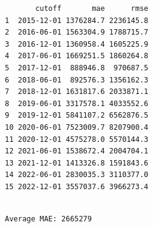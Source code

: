 \documentclass[
]{article}
\newenvironment{Shaded}{\begin{snugshade}}{\end{snugshade}}
\newcommand{\AttributeTok}[1]{\textcolor[rgb]{0.13,0.29,0.53}{#1}}
\newcommand{\CommentTok}[1]{\textcolor[rgb]{0.56,0.35,0.01}{\textit{#1}}}
\newcommand{\FunctionTok}[1]{\textcolor[rgb]{0.13,0.29,0.53}{\textbf{#1}}}
\newcommand{\NormalTok}[1]{#1}
\newcommand{\OtherTok}[1]{\textcolor[rgb]{0.56,0.35,0.01}{#1}}
\newcommand{\SpecialCharTok}[1]{\textcolor[rgb]{0.81,0.36,0.00}{\textbf{#1}}}
\newcommand{\StringTok}[1]{\textcolor[rgb]{0.31,0.60,0.02}{#1}}
\begin{document}
\begin{Shaded}
\end{Shaded}

\begin{verbatim}
       cutoff       mae      rmse
1  2015-12-01 1376284.7 2236145.8
2  2016-06-01 1563304.9 1788715.7
3  2016-12-01 1360958.4 1605225.9
4  2017-06-01 1669251.5 1860264.8
5  2017-12-01  888946.8  970687.5
6  2018-06-01  892576.3 1356162.3
7  2018-12-01 1631817.6 2033871.1
8  2019-06-01 3317578.1 4033552.6
9  2019-12-01 5841107.2 6562876.5
10 2020-06-01 7523009.7 8207900.4
11 2020-12-01 4575278.0 5570144.3
12 2021-06-01 1538672.4 2004704.1
13 2021-12-01 1413326.8 1591843.6
14 2022-06-01 2830035.3 3110377.0
15 2022-12-01 3557037.6 3966273.4
\end{verbatim}

\begin{Shaded}
\end{Shaded}

\begin{verbatim}

Average MAE: 2665279
\end{verbatim}

\begin{Shaded}
\end{Shaded}
\end{document}
